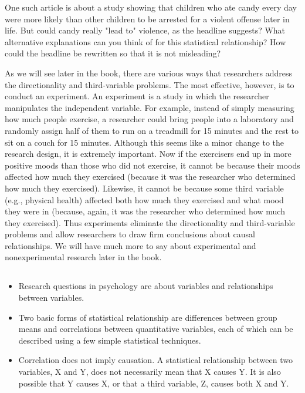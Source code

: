 One such article is about a study showing that children who ate candy every day were more likely than other children to be arrested for a violent offense later in life. But could candy really "lead to" violence, as the headline suggests? What alternative explanations can you think of for this statistical relationship? How could the headline be rewritten so that it is not misleading?

As we will see later in the book, there are various ways that researchers address the directionality and third-variable problems. The most effective, however, is to conduct an experiment. An experiment is a study in which the researcher manipulates the independent variable. For example, instead of simply measuring how much people exercise, a researcher could bring people into a laboratory and randomly assign half of them to run on a treadmill for 15 minutes and the rest to sit on a couch for 15 minutes. Although this seems like a minor change to the research design, it is extremely important. Now if the exercisers end up in more positive moods than those who did not exercise, it cannot be because their moods affected how much they exercised (because it was the researcher who determined how much they exercised). Likewise, it cannot be because some third variable (e.g., physical health) affected both how much they exercised and what mood they were in (because, again, it was the researcher who determined how much they exercised). Thus experiments eliminate the directionality and third-variable problems and allow researchers to draw firm conclusions about causal relationships. We will have much more to say about experimental and nonexperimental research later in the book.

\subsection{}
\begin{fullwidth}
  \begin{itemize}
  \item Research questions in psychology are about variables and relationships between variables.
  \item Two basic forms of statistical relationship are differences between group means and correlations
  between quantitative variables, each of which can be described using a few simple statistical
  techniques.
  \item Correlation does not imply causation. A statistical relationship between two variables, X and Y,
  does not necessarily mean that X causes Y. It is also possible that Y causes X, or that a third variable, Z, causes both X and Y.
  \end{itemize}
\end{fullwidth}

